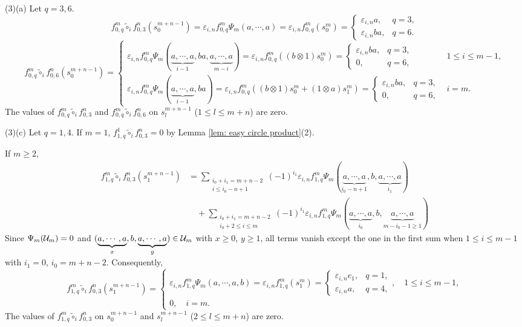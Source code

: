 \documentclass[10pt, reqno]{amsart}
\theoremstyle{definition}
\theoremstyle{remark}
\numberwithin{equation}{section}
\begin{document}
(3)(a) Let $q=3,6$.
\[f_{0,q}^m  \tilde{\circ}_i f_{0,3}^n(s_0^{m+n-1})=\varepsilon_{i,n}f_{0,q}^m\Psi_m(a,\cdots,a)=\varepsilon_{i,n}f_{0,q}^m(s_0^m)=\begin{cases}
        \varepsilon_{i,n}a, &q=3,\\
        \varepsilon_{i,n}ba, &q=6.
    \end{cases}\]
\[f_{0,q}^m  \tilde{\circ}_i f_{0,6}^n(s_0^{m+n-1})
=\begin{cases}
        \varepsilon_{i,n}f_{0,q}^m\Psi_m(\underbrace{a,\cdots,a}_{i-1},ba,\underbrace{a,\cdots,a}_{m-i})=\varepsilon_{i,n}f_{0,q}^m((b\otimes1)s_0^m)=\begin{cases}
            \varepsilon_{i,n}ba, &q=3,\\
            0, &q=6,
        \end{cases}  &1\le i\le m-1,\\
         \varepsilon_{i,n}f_{0,q}^m\Psi_m(\underbrace{a,\cdots,a}_{i-1},ba)=\varepsilon_{i,n}f_{0,q}^m((b\otimes1)s_0^m+(1\otimes a)s_1^m)=\begin{cases}
            \varepsilon_{i,n} ba, &q=3,\\
             0, &q=6,
         \end{cases}  &i=m.
    \end{cases}\]
The values of \(f_{0,q}^m \tilde{\circ}_i f_{0,3}^n\) and \(f_{0,q}^m \tilde{\circ}_i f_{0,6}^n\) on \(s_l^{m+n-1}\) (\(1\le l \le m+n\)) are zero.

(3)(c) Let $q= 1,4$. If \(m=1\), \(f_{1,q}^1  \tilde{\circ}_i f_{0,3}^n=0\) by Lemma \ref{lem: easy circle product}(2). 

If \(m\ge 2\),
\[\begin{aligned}
    f_{1,q}^m  \tilde{\circ}_i f_{0,3}^n(s_1^{m+n-1}) &=\sum_{\substack{i_0+i_1=m+n-2\\  i\le i_0-n+1}}(-1)^{i_1}\varepsilon_{i,n} f_{1,q}^m\Psi_m(\underbrace{a,\cdots,a}_{i_0-n+1},b,\underbrace{a,\cdots,a}_{i_1})\\
     & \quad +\sum_{\substack{i_0+i_1=m+n-2\\ i_0+2\le i\le m}}(-1)^{i_1} \varepsilon_{i,n}f_{1,q}^m\Psi_m(\underbrace{a,\cdots,a}_{i_0},b,\underbrace{a,\cdots,a}_{m-i_0-1\ge 1}) 
\end{aligned}\]
 Since \(\Psi_m(\mathcal{U}_m)=0\) and 
\((\underbrace{a,\cdots,a}_{x},b,\underbrace{a,\cdots,a}_{y})\in \mathcal{U}_m\) with \(x\ge 0\), \(y\ge 1\), all terms vanish except the one  in the first sum when \(1\le i\le m-1\) with \(i_1=0\), \(i_0=m+n-2\). Consequently,
 \[f_{1,q}^m  \tilde{\circ}_i f_{0,3}^n(s_1^{m+n-1})=\begin{cases}
        \varepsilon_{i,n} f_{1,q}^m\Psi_m(a,\cdots,a,b)=\varepsilon_{i,n}f_{1,q}^m(s_1^m)=\begin{cases}
             \varepsilon_{i,n}e_1, &q=1,\\
            \varepsilon_{i,n} a, &q=4,
         \end{cases}, \quad 1\le i\le m-1,\\
          0, \quad i=m.
     \end{cases}\]
The values of \(f_{1,q}^m \tilde{\circ}_i f_{0,3}^n\) on \(s_0^{m+n-1}\) and \(s_l^{m+n-1}\) (\(2\le l \le m+n\)) are zero.
\end{document}
